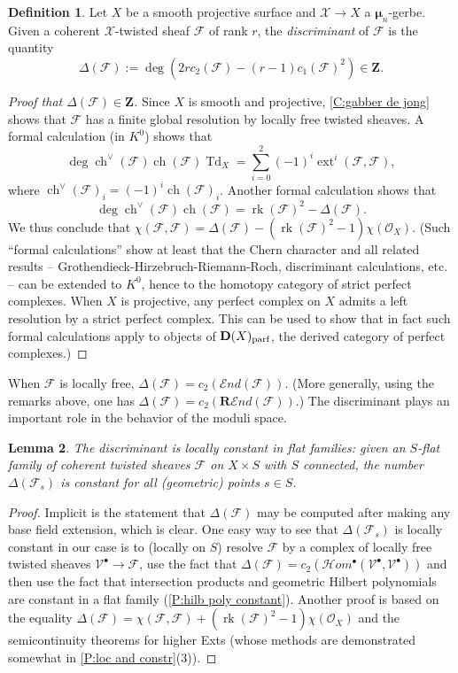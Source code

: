 \documentclass[11pt]{amsart}
\newcommand{\field}[1]{\mathbf #1}
\newcommand{\ms}[1]{\mathscr #1}
\newcommand{\Z}{\field Z}
\newcommand{\shom}{\ms H\!om}
\newcommand{\send}{\ms E\!nd}
\newcommand{\rsend}{\mathbf{R}\ms E\!nd}
\newcommand{\td}{\operatorname{Td}}
\DeclareMathOperator{\chern}{ch}
\newcommand{\m}{\boldsymbol{\mu}}
\DeclareMathOperator{\dimext}{ext}
\DeclareMathOperator{\D}{\operatorname{\bf D}}
\renewcommand{\[}{[\!\hspace{0.03em}[}
\renewcommand{\]}{]\!\hspace{0.03em}]}
\renewcommand{\(}{(\!\hspace{0.03em}(}
\renewcommand{\)}{)\!\hspace{0.03em})}
\DeclareMathOperator{\rk}{\operatorname{rk}}
\newtheorem{lem}{Lemma}[subsubsection]%
\theoremstyle{definition}
\newtheorem{defn}[lem]{Definition}
\theoremstyle{remark}
\begin{document}
\begin{defn}\label{D:discriminant} Let $X$ be a smooth projective surface and $\ms X\to X$ a 
$\m_{n}$-gerbe.  Given a coherent $\ms X$-twisted sheaf $\ms F$ of rank $r$, the 
\emph{discriminant\/} of $\ms F$ is the quantity 
$$\Delta(\ms F):=\deg(2rc_{2}(\ms F)-(r-1)c_{1}(\ms 
F)^{2})\in\Z.$$
\end{defn}
\begin{proof}[Proof that $\Delta(\ms F)\in\Z$]  Since $X$ is smooth 
and projective, 
\ref{C:gabber de jong} shows that $\ms F$ has a finite global resolution 
by locally free twisted sheaves.  A formal calculation (in $K^{0}$) shows that 
$$\deg\chern^{\vee}(\ms F)\chern(\ms 
F)\td_{X}=\sum_{i=0}^{2}(-1)^{i}\dimext^{i}(\ms F,\ms F),$$ where 
$\chern^{\vee}(\ms F)_{i}=(-1)^{i}\chern(\ms F)_{i}$.  Another formal 
calculation shows that $$\deg\chern^{\vee}(\ms F)\chern(\ms F)=\rk(\ms 
F)^{2}-\Delta(\ms F).$$  We thus conclude that $\chi(\ms F,\ms 
F)=\Delta(\ms F)-(\rk(\ms F)^{2}-1)\chi({\ms O}_{X})$.  (Such ``formal 
calculations'' show at least that the Chern character and all related 
results -- Grothendieck-Hirzebruch-Riemann-Roch, discriminant 
calculations, etc. -- can be extended to $K^{0}$, hence to the 
homotopy category of strict perfect complexes.  When $X$ is 
projective, any perfect complex on $X$ admits a left resolution by a 
strict perfect complex.  This can be used to show that in fact such 
formal calculations apply to objects of $\D(X)_{\text{parf}}$, the 
derived category of perfect complexes.)
\end{proof}
When $\ms F$ is locally free, $\Delta(\ms F)=c_{2}(\send(\ms F))$.  
(More generally, using the remarks above, one has $\Delta(\ms F)=c_{2}(\rsend(\ms F))$.)  
The discriminant plays an important role in the behavior of the moduli space.

\begin{lem} The discriminant is locally constant in flat families: 
given an $S$-flat family of coherent twisted sheaves $\ms F$ on $X\times 
S$ with $S$ connected, the number $\Delta(\ms F_{s})$ is constant for 
all (geometric) points $s\in S$.
\end{lem}
\begin{proof} Implicit is the statement that $\Delta(\ms F)$ may be 
computed after making any base field extension, which is clear.  One 
easy way to see that $\Delta(\ms F_{s})$ is locally constant in our 
case is to (locally on $S$) resolve $\ms F$ by a complex of locally 
free twisted sheaves $\ms V^{\bullet}\to\ms F$, use the fact that 
$\Delta(\ms F)=c_{2}(\shom^{\bullet}(\ms V^{\bullet},\ms V^{\bullet}))$ 
and then use the fact that intersection products and geometric Hilbert 
polynomials are constant in a flat family (\ref{P:hilb poly 
constant}).  Another proof is based on the equality $\Delta(\ms 
F)=\chi(\ms F,\ms F)+(\rk(\ms F)^{2}-1)\chi({\ms O}_{X})$ and the 
semicontinuity theorems for higher Exts (whose methods are 
demonstrated somewhat in \ref{P:loc and constr}(3)).
\end{proof}
\end{document}
